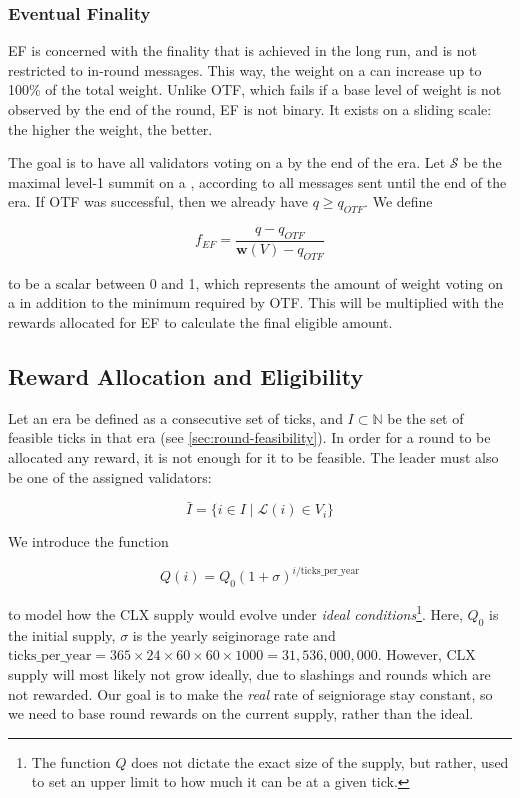 \subsubsection*{Eventual Finality}
\label{sec:eventual-finality}

EF is concerned with the finality that is achieved in the long run, and is not restricted to in-round messages. This way, the weight on a \PROP can increase up to 100\% of the total weight. Unlike OTF, which fails if a base level of weight is not observed by the end of the round, EF is not binary. It exists on a sliding scale: the higher the weight, the better.

The goal is to have all validators voting on a \PROP by the end of the era. Let $\mathcal{S}$ be the maximal level-1 summit on a \PROP, according to all messages sent until the end of the era. If OTF was successful, then we already have $q\geq q_{OTF}$. We define

\begin{equation}
f_{EF} = \frac{q - q_{OTF}}{\boldsymbol{w}(V)-q_{OTF}}
\end{equation}

to be a scalar between 0 and 1, which represents the amount of weight voting on a \PROP in addition to the minimum required by OTF. This will be multiplied with the rewards allocated for EF to calculate the final eligible amount.

\subsection{Reward Allocation and Eligibility}
\label{sec:reward-allocation-eligibility}

Let an era be defined as a consecutive set of ticks, and $I\subset\mathbb{N}$ be the set of feasible ticks in that era (see \ref{sec:round-feasibility}). In order for a round to be allocated any reward, it is not enough for it to be feasible. The leader must also be one of the assigned validators:

\begin{equation}
\bar{I}=\{i\in I \mid \mathcal{L}(i) \in V_i\}
\end{equation}

We introduce the function

\begin{equation}
Q(i) = Q_0 (1+\sigma)^{i/\text{ticks\_per\_year}}
\end{equation}

to model how the CLX supply would evolve under \emph{ideal conditions}\footnote{The function $Q$ does not dictate the exact size of the supply, but rather, used to set an upper limit to how much it can be at a given tick.}. Here, $Q_0$ is the initial supply, $\sigma$ is the yearly seiginorage rate and $\text{ticks\_per\_year} = 365\times 24\times 60 \times 60 \times 1000 = 31,\!536,\!000,\!000$. However, CLX supply will most likely not grow ideally, due to slashings and rounds which are not rewarded. Our goal is to make the \emph{real} rate of seigniorage stay constant, so we need to base round rewards on the current supply, rather than the ideal.

